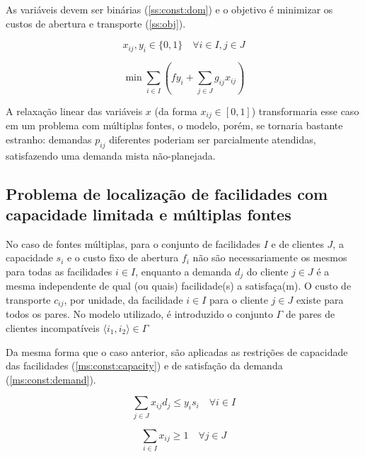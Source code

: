 \documentclass[]{article}
\begin{document}
	As variáveis devem ser binárias (\ref{ss:const:dom}) 
	e o objetivo é minimizar os custos de abertura e transporte (\ref{ss:obj}).
	
	\begin{equation}
		\label{ss:const:dom}		
		x_{ij}, y_i \in \{0, 1\}
		\quad
		\forall i \in I, j \in J
	\end{equation}	
	
	\begin{equation}
		\label{ss:obj}		
		\min \sum_{i \in I} 
		(
			f y_i + \sum_{j \in J} g_{ij} x_{ij}
		)
	\end{equation}

	A relaxação linear das variáveis $x$ (da forma $x_{ij} \in [0,1]$) transformaria esse caso em um problema com múltiplas fontes, 
	o modelo, porém, se tornaria bastante estranho:  
	demandas $p_{ij}$ diferentes poderiam ser parcialmente atendidas, satisfazendo uma demanda mista não-planejada.
	
	\subsection{Problema de localização de facilidades com capacidade limitada e múltiplas fontes}
	
	No caso de fontes múltiplas, para o conjunto de facilidades $I$ e de clientes $J$, 
	a capacidade $s_i$ e o custo fixo de abertura $f_i$ não são necessariamente os mesmos para todas as facilidades $i \in I$, 
	enquanto a demanda $d_j$ do cliente $j \in J$ é a mesma
	independente de qual (ou quais) facilidade(s) a satisfaça(m). 
	O custo de transporte $c_{ij}$, por unidade, da facilidade $i \in I$ para o cliente $j \in J$ existe para todos os pares.
	No modelo utilizado, é introduzido o conjunto $\Gamma$ de pares de clientes incompatíveis $\langle i_1, i_2 \rangle \in \Gamma$
	
	Da mesma forma que o caso anterior, são aplicadas as restrições de capacidade das facilidades (\ref{ms:const:capacity}) e de satisfação da demanda (\ref{ms:const:demand}).
	
	\begin{equation}
		\label{ms:const:capacity}		
		\sum_{j \in J} x_{ij} d_{j} \le y_i s_i 
		\quad
		\forall i \in I
	\end{equation}	
	
	\begin{equation}
		\label{ms:const:demand}		
		\sum_{i \in I} x_{ij} \ge 1 
		\quad
		\forall j \in J
	\end{equation}
	
\end{document}
